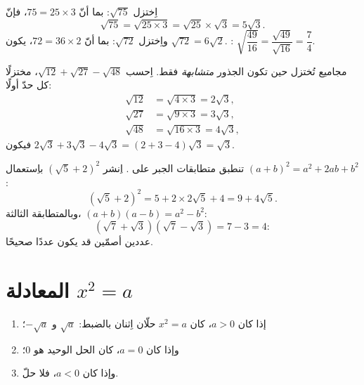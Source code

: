\begin{example}\label{ex:g9:sqrt:simplify}
اِختزل $\sqrt{75}$: بما أنّ $75 = 25 \times 3$، فإنّ
\[
\sqrt{75} = \sqrt{25 \times 3} = \sqrt{25} \times \sqrt 3 = 5\sqrt3 .
\]
واِختزل $\sqrt{72}$: بما أنّ $72 = 36 \times 2$، يكون
$\sqrt{72} = 6\sqrt2$. :
$\sqrt{\dfrac{49}{16}} = \dfrac{\sqrt{49}}{\sqrt{16}} = \dfrac74$.
\end{example}

\begin{example}\label{ex:g9:sqrt:add}
مجاميع  تُختزل حين تكون الجذور
\emph{متشابهة} فقط. اِحسب $\sqrt{12} + \sqrt{27} - \sqrt{48}$،
مختزلًا كل حدّ أولًا:
\begin{align*}
\sqrt{12} &= \sqrt{4 \times 3} = 2\sqrt3, \\
\sqrt{27} &= \sqrt{9 \times 3} = 3\sqrt3, \\
\sqrt{48} &= \sqrt{16 \times 3} = 4\sqrt3,
\end{align*}
فيكون  $2\sqrt3 + 3\sqrt3 - 4\sqrt3 = (2 + 3 - 4)\sqrt3 = \sqrt3$.
\end{example}

\begin{example}\label{ex:g9:sqrt:expand}
تنطبق متطابقات الجبر على . اِنشر
$\left(\sqrt5 + 2\right)^2$ باِستعمال $(a+b)^2 = a^2 + 2ab + b^2$:
\[
\left(\sqrt5 + 2\right)^2 = 5 + 2 \times 2\sqrt5 + 4 = 9 + 4\sqrt5 .
\]
وبالمتطابقة الثالثة، $(a+b)(a-b) = a^2 - b^2$:
\[
\left(\sqrt7 + \sqrt3\right)\left(\sqrt7 - \sqrt3\right) = 7 - 3 = 4 :
\]
 عددين أصمّين قد يكون عددًا صحيحًا.
\end{example}

\section{المعادلة \texorpdfstring{$x^2 = a$}{x2 = a}}

\begin{theorem}[حل $x^2 = a$]\label{thm:g9:sqrt:equation}
\begin{enumerate}
  \item إذا كان $a > 0$، كان  $x^2 = a$ حلّان اِثنان
        بالضبط: $\sqrt a$ و $-\sqrt a$؛
  \item وإذا كان $a = 0$، كان الحل الوحيد هو $0$؛
  \item وإذا كان $a < 0$، فلا حلّ.
\end{enumerate}
\end{theorem}

